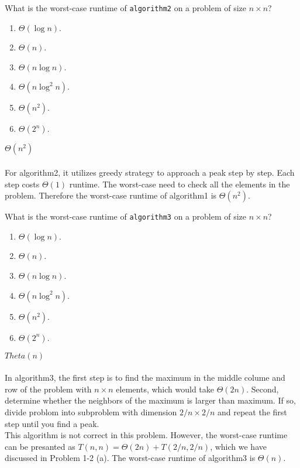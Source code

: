 \documentclass[12pt,twoside]{article}
\begin{document}
\begin{problems}
\begin{problemparts}
\problempart {} What is the worst-case runtime of \texttt{algorithm2} on a problem of size $n \times n$?
\begin{enumerate}
\item $\Theta(\log n)$.
\item $\Theta(n)$.
\item $\Theta(n \log n)$.
\item $\Theta(n \log^2 n)$.
\item $\Theta(n^2)$.
\item $\Theta(2^n)$.
\end{enumerate}

\ifsolution \solution{}
$\Theta(n^2)$
\\
\\
For algorithm2, it utilizes greedy strategy to approach a peak  step by step. Each step costs $\Theta(1)$ runtime.
The worst-case need to check all the elements in the problem. Therefore the worst-case runtime of algorithm1 is 
$\Theta(n^2)$.
\\
\fi

\problempart {} What is the worst-case runtime of \texttt{algorithm3} on a problem of size $n \times n$?
\begin{enumerate}
\item $\Theta(\log n)$.
\item $\Theta(n)$.
\item $\Theta(n \log n)$.
\item $\Theta(n \log^2 n)$.
\item $\Theta(n^2)$.
\item $\Theta(2^n)$.
\end{enumerate}

\ifsolution \solution{}
$Theta(n)$
\\
\\
In algorithm3, the first step is to find the maximum in the middle colume and row of the problem with $n\times n$ elements,
which would take $\Theta(2n)$. Second, determine whether the neighbors of the maximum is larger than maximum. If so, 
divide problom into subproblem with dimension $2/n\times2/n$ and repeat the first step until you find a peak.
\\
This algorithm is not correct in this problem. However, the worst-case runtime can be presanted as $T(n,n) = \Theta(2n) +
T(2/n,2/n)$, which we have discussed in Problem 1-2 (a). The worst-case runtime of algorithm3 is $\Theta(n)$.
\\


\end{problemparts}
\end{problems}
\end{document}
